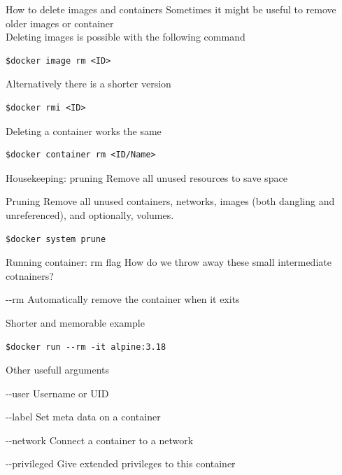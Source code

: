 \documentclass[12pt]{beamer}
\begin{document}
\begin{frame}[fragile]{How to delete images and containers}
    Sometimes it might be useful to remove older images or container\\
    Deleting images is possible with the following command\cite{docker_rmi}
    \begin{lstlisting}[language=OwnBash, basicstyle=\small]
$docker image rm <ID>
    \end{lstlisting}
    Alternatively there is a shorter version
    \begin{lstlisting}[language=OwnBash, basicstyle=\small]
$docker rmi <ID>
    \end{lstlisting}
    Deleting a container works the same
    \begin{lstlisting}[language=OwnBash, basicstyle=\small]
$docker container rm <ID/Name>
    \end{lstlisting}
\end{frame}

\begin{frame}[fragile]{Housekeeping: pruning}
    Remove all unused resources to save space
    \begin{block}{Pruning\cite{docker_system_prune}}
        Remove all unused containers, networks, images (both dangling and unreferenced), and optionally, volumes.
    \end{block}
    \begin{lstlisting}[language=OwnBash, basicstyle=\small]
$docker system prune 
    \end{lstlisting}
\end{frame}

\begin{frame}[fragile]{Running container: rm flag}
    How do we throw away these small intermediate cotnainers?
    \begin{block}{-{}-rm\cite{docker_run}}
        Automatically remove the container when it exits
    \end{block}
    Shorter and memorable example
    \begin{lstlisting}[language=OwnBash]
$docker run --rm -it alpine:3.18
    \end{lstlisting}
\end{frame}

\begin{frame}[fragile]{Other usefull arguments}
    \begin{block}{-{}-user \cite{docker_run}}
        Username or UID
    \end{block}
    \begin{block}{-{}-label \cite{docker_run}}
        Set meta data on a container
    \end{block}
    \begin{block}{-{}-network \cite{docker_run}}
        Connect a container to a network
    \end{block}
    \begin{block}{-{}-privileged\cite{docker_run}}
        Give extended privileges to this container
    \end{block}
\end{frame}
\end{document}
